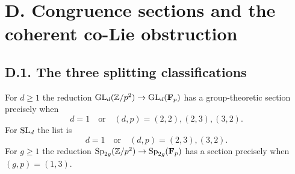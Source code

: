 \section{D. Congruence sections and the coherent co-Lie obstruction}
\subsection{D.1. The three splitting classifications}

\begin{theorem}\label{thm:DE-split}
For $d\geq 1$ the reduction $\operatorname{GL}_d(\mathbb Z/p^2)\to\operatorname{GL}_d(\mathbf F_p)$ has a group-theoretic section precisely when
\[
 d=1\quad\text{or}\quad(d,p)=(2,2),(2,3),(3,2).
\]
For $\operatorname{SL}_d$ the list is
\[
 d=1\quad\text{or}\quad(d,p)=(2,3),(3,2).
\]
For $g\geq1$ the reduction $\operatorname{Sp}_{2g}(\mathbb Z/p^2)\to\operatorname{Sp}_{2g}(\mathbf F_p)$ has a section precisely when $(g,p)=(1,3)$.
\end{theorem}

